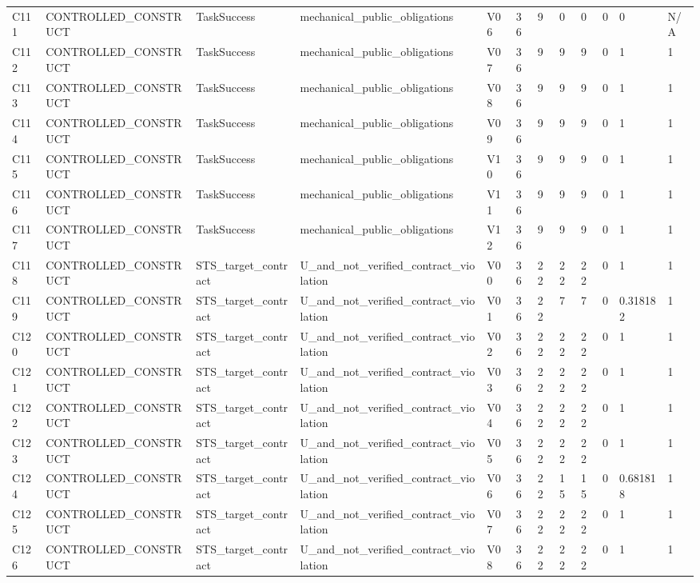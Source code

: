 \begin{longtable}{llllllllllll}
C111 & CONTROLLED\_CONSTRUCT & TaskSuccess & mechanical\_public\_obligations & V06 & 36 & 9 & 0 & 0 & 0 & 0 & N/A \\
C112 & CONTROLLED\_CONSTRUCT & TaskSuccess & mechanical\_public\_obligations & V07 & 36 & 9 & 9 & 9 & 0 & 1 & 1 \\
C113 & CONTROLLED\_CONSTRUCT & TaskSuccess & mechanical\_public\_obligations & V08 & 36 & 9 & 9 & 9 & 0 & 1 & 1 \\
C114 & CONTROLLED\_CONSTRUCT & TaskSuccess & mechanical\_public\_obligations & V09 & 36 & 9 & 9 & 9 & 0 & 1 & 1 \\
C115 & CONTROLLED\_CONSTRUCT & TaskSuccess & mechanical\_public\_obligations & V10 & 36 & 9 & 9 & 9 & 0 & 1 & 1 \\
C116 & CONTROLLED\_CONSTRUCT & TaskSuccess & mechanical\_public\_obligations & V11 & 36 & 9 & 9 & 9 & 0 & 1 & 1 \\
C117 & CONTROLLED\_CONSTRUCT & TaskSuccess & mechanical\_public\_obligations & V12 & 36 & 9 & 9 & 9 & 0 & 1 & 1 \\
C118 & CONTROLLED\_CONSTRUCT & STS\_target\_contract & U\_and\_not\_verified\_contract\_violation & V00 & 36 & 22 & 22 & 22 & 0 & 1 & 1 \\
C119 & CONTROLLED\_CONSTRUCT & STS\_target\_contract & U\_and\_not\_verified\_contract\_violation & V01 & 36 & 22 & 7 & 7 & 0 & 0.318182 & 1 \\
C120 & CONTROLLED\_CONSTRUCT & STS\_target\_contract & U\_and\_not\_verified\_contract\_violation & V02 & 36 & 22 & 22 & 22 & 0 & 1 & 1 \\
C121 & CONTROLLED\_CONSTRUCT & STS\_target\_contract & U\_and\_not\_verified\_contract\_violation & V03 & 36 & 22 & 22 & 22 & 0 & 1 & 1 \\
C122 & CONTROLLED\_CONSTRUCT & STS\_target\_contract & U\_and\_not\_verified\_contract\_violation & V04 & 36 & 22 & 22 & 22 & 0 & 1 & 1 \\
C123 & CONTROLLED\_CONSTRUCT & STS\_target\_contract & U\_and\_not\_verified\_contract\_violation & V05 & 36 & 22 & 22 & 22 & 0 & 1 & 1 \\
C124 & CONTROLLED\_CONSTRUCT & STS\_target\_contract & U\_and\_not\_verified\_contract\_violation & V06 & 36 & 22 & 15 & 15 & 0 & 0.681818 & 1 \\
C125 & CONTROLLED\_CONSTRUCT & STS\_target\_contract & U\_and\_not\_verified\_contract\_violation & V07 & 36 & 22 & 22 & 22 & 0 & 1 & 1 \\
C126 & CONTROLLED\_CONSTRUCT & STS\_target\_contract & U\_and\_not\_verified\_contract\_violation & V08 & 36 & 22 & 22 & 22 & 0 & 1 & 1 \\

\end{longtable}
